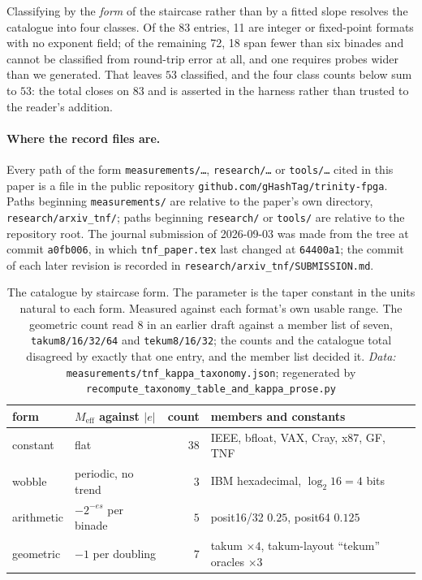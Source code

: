 \documentclass[11pt]{article}
\theoremstyle{definition}
\begin{document}
Classifying by the \emph{form} of the staircase rather than by a fitted slope
resolves the catalogue into four classes. Of the 83 entries, 11 are integer or
fixed-point formats with no exponent field; of the remaining 72, 18 span fewer
than six binades and cannot be classified from round-trip error at all, and one
requires probes wider than we generated. That leaves $53$ classified, and the
four class counts below sum to $53$: the total closes on $83$ and is asserted in
the harness rather than trusted to the reader's addition.

\paragraph{Where the record files are.} Every path of the form \texttt{measurements/\ldots}, \texttt{research/\ldots} or \texttt{tools/\ldots} cited in this paper is a file in the public repository \texttt{github.com/gHashTag/trinity-fpga}. Paths beginning \texttt{measurements/} are relative to the paper's own directory, \texttt{research/arxiv\_tnf/}; paths beginning \texttt{research/} or \texttt{tools/} are relative to the repository root. The journal submission of 2026-09-03 was made from the tree at commit \texttt{a0fb006}, in which \texttt{tnf\_paper.tex} last changed at \texttt{64400a1}; the commit of each later revision is recorded in \texttt{research/arxiv\_tnf/SUBMISSION.md}.

\begin{table}[t]\centering
\caption{The catalogue by staircase form. The parameter is the taper constant in
the units natural to each form. Measured against each format's own usable range.
The geometric count read $8$ in an earlier draft against a member list of seven,
\texttt{takum8/16/32/64} and \texttt{tekum8/16/32}; the counts and the catalogue
total disagreed by exactly that one entry, and the member list decided it. \emph{Data:} \texttt{measurements/tnf\_kappa\_taxonomy.json}; regenerated by \texttt{recompute\_taxonomy\_table\_and\_kappa\_prose.py}}
\label{tab:taxonomy}
\begin{tabular}{llrl}
\toprule
form & $M_{\mathrm{eff}}$ against $|e|$ & count & members and constants \\
\midrule
constant   & flat                          & $38$ & IEEE, bfloat, VAX, Cray, x87, GF, TNF \\
wobble     & periodic, no trend            & $3$  & IBM hexadecimal, $\log_2 16 = 4$ bits \\
arithmetic & $-2^{-es}$ per binade         & $5$  & posit16/32 $0.25$, posit64 $0.125$ \\
geometric  & $-1$ per doubling             & $7$  & takum $\times 4$, takum-layout ``tekum'' oracles $\times 3$ \\
\bottomrule
\end{tabular}
\end{table}
\end{document}
